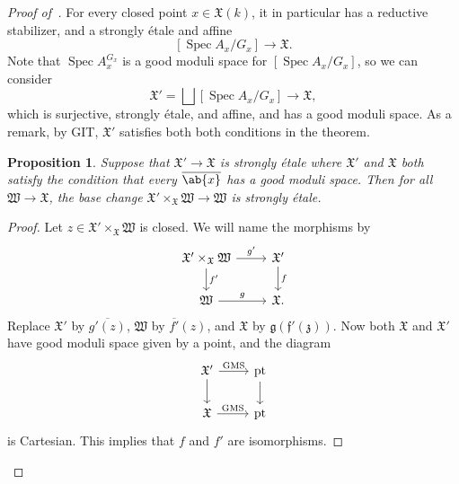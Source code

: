 \documentclass{amsart}
\newtheorem{prop}[thm]{Proposition}
\theoremstyle{definition}
\theoremstyle{remark}
\theoremstyle{plain}
\theoremstyle{definition}
\theoremstyle{remark}
\newcommand{\mf}[1]{\mathfrak{#1}}
\newcommand{\on}[1]{\operatorname{#1}}
\newcommand{\ol}[1]{\overline{#1}}
\newcommand{\1}{\mathbf{1}}
\newcommand{\2}{\mathbf{2}}
\newcommand{\3}{\mathbf{3}}
\DeclareMathOperator{\Spec}{Spec}
\begin{document}
\begin{proof}[Proof of~]
    For every closed point \(x \in \mf{X}(k)\), it in particular has a reductive stabilizer, and a strongly \'etale and affine
    \[ [\Spec A_x / G_x] \to \mf{X}. \]
    Note that \(\Spec A_x^{G_x}\) is a good moduli space for \([\Spec A_x / G_x]\), so we can consider
    \[ \mf{X}' = \bigsqcup [\Spec A_x / G_x] \to \mf{X}, \]
    which is surjective, strongly \'etale, and affine, and has a good moduli space. As a remark, by GIT, \(\mf{X}'\) satisfies both both conditions in the theorem.

    \begin{prop}
        Suppose that \(\mf{X}' \to \mf{X}\) is strongly \'etale where \(\mf{X}'\) and \(\mf{X}\) both satisfy the condition that every \(\ol{\ab\{x\}}\) has a good moduli space. Then for all \(\mf{W} \to \mf{X}\), the base change \(\mf{X}' \times_{\mf{X}} \mf{W} \to \mf{W}\) is strongly \'etale. 
    \end{prop}

    \begin{proof}
        Let \(z \in \mf{X}' \times_{\mf{X}} \mf{W}\) is closed. We will name the morphisms by
        \begin{equation*}
        \begin{tikzcd}
            \mf{X}' \times_{\mf{X}} \mf{W} \ar{r}{g'} \ar{d}{f'} & \mf{X}' \ar{d}{f} \\
            \mf{W} \ar{r}{g} & \mf{X}.
        \end{tikzcd}
        \end{equation*}
        Replace \(\mf{X}'\) by \(\ol{g'(z)}\), \(\mf{W}\) by \(\ol{f'}(z)\), and \(\mf{X}\) by \(\mf{g(f'(z))}\). Now both \(\mf{X}\) and \(\mf{X}'\) have good moduli space given by a point, and the diagram
        \begin{equation*}
        \begin{tikzcd}
            \mf{X}' \ar{r}{\on{GMS}} \ar{d} & \on{pt} \ar{d} \\
            \mf{X} \ar{r}{\on{GMS}} & \on{pt}
        \end{tikzcd}
        \end{equation*}
        is Cartesian. This implies that \(f\) and \(f'\) are isomorphisms.
    \end{proof}


\end{proof}
\end{document}
